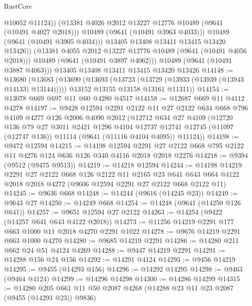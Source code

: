 \begin{lexlean}{RustCore}
\begin{coremodule}
                    @10052
                    @11124))
                (@13381 @4026 @2012 @13227 @12776 @10489 (@9641 (@10491 @4027 @2018)))
                @10489
                (@9641 (@10491 @3963 @4033)))
              @10489
              (@9641 (@10491 @3905 @4034)))
            @13405
            @13408
            @13411
            @13415
            @13420
            @13426))
        (@13381 @4055 @2012 @13227 @12776 @10489 (@9641 (@10491 @4056 @2018)))
        @10489
        (@9641 (@10491 @3897 @4062)))
      @10489
      (@9641 (@10491 @3887 @4063)))
    @13405
    @13408
    @13411
    @13415
    @13420
    @13426
@14148 := @13680
    (@13683
      (@13690
        (@13693 (@13723 (@13729 (@13933 (@13939 (@13943 @14133) @13144)))))
        @13152
        @13155
        @13158
        @13161
        @11311))
@14154 := @13078 @669 @697 @11 @60 @4280 @4517
@14158 := @12687 @669 @11 @4112 @4278
@14197 := @9428
    @12594
    @2291
    @2122
    @11
    @27
    @2122
    @634
    @668
    @796
    @4109
    @4277
    @126
    @2006
    @4090
    @2012
    (@12712
      @634
      @27
      @4109
      (@12720
        @136
        @79
        @27
        @3011
        @2421
        @1296
        @4104
        @12737
        @12741
        @12745
        (@11097 (@12747 @136))
        @11114
        (@9641 (@11116 @4104 @4095))
        @11124))
@14198 := @9472 @12594
@14215 := @14198
    @12594
    @2291
    @27
    @2122
    @668
    @795
    @2122
    @11
    @4276
    @124
    @636
    @126
    @340
    @4116
    @2018
    @2018
    @2276
@14218 := @9394 (@9512 (@9475 @9513))
@14219 := @14218 @12594
@14244 := @14198
    @14219
    @2291
    @27
    @2122
    @668
    @126
    @2122
    @11
    @2165
    @23
    @641
    @643
    @664
    @4122
    @2018
    @2018
    @4272
    (@9606 @12594 @2291 @27 @2122 @668 @2122 @11)
@14245 := @9636 @668
@14248 := @14244 (@9616 (@14245 @23))
@14249 := @9643 @27
@14250 := @14249 @668
@14254 := @14248 (@9641 (@14250 @126 @641))
@14257 := @9651 @12594 @27 @2122
@14263 := @14254 (@9422 (@14257 @641 @643 @4122 @2018))
@14273 := @11256 @14219 @2291 @177 @663 @1000 @11 @2018 @4270 @2291 @1022
@14278 := @9676 @14219 @2291 @663 @1000 @4270
@14280 := @9685 @14219 @2291
@14286 := @14280 @211 @662 @24 @51 @4124 @4269
@14288 := @9447 @14219 @2291
@14291 := @14288 @156 @24 @156
@14292 := @14291 @4124
@14293 := @9456 @14219
@14295 := @9455 (@14293 @156)
@14296 := @14292 @14295
@14298 := @9463 (@9464 @4124)
@14299 := @14296 @14298
@14300 := @14286 @14299
@14315 := @14280 @205 @661 @11 @50 @2087 @4268 (@14288 @23 @11 @23 @2087 (@9455 (@14293 @23)) @9836)

\end{coremodule}
\end{lexlean}
